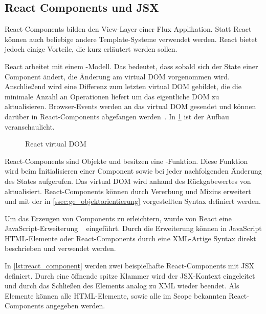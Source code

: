 \subsection{React Components und JSX}
\label{ssec:gf_react_components_und_jsx}

React-Components bilden den View-Layer einer Flux Applikation.  Statt React
können auch beliebige andere Template-Systeme verwendet werden.  React bietet
jedoch einige Vorteile, die kurz erläutert werden sollen.

React arbeitet mit einem -Modell.  Das bedeutet,
dass sobald sich der State einer Component ändert, die Änderung am virtual DOM
vorgenommen wird.  Anschließend wird eine Differenz zum letzten virtual DOM
gebildet, die die minimale Anzahl an Operationen liefert um das eigentliche DOM
zu aktualisieren.  Browser-Events werden an das virtual DOM gesendet und können
darüber in React-Components abgefangen werden~\cite{ReactDemystified}.
In \cref{fig:react_virtual_dom} ist der Aufbau veranschaulicht.

\begin{figure}
    \centering
    
    \caption{React virtual DOM}
    \label{fig:react_virtual_dom}
\end{figure}

React-Components sind Objekte und besitzen eine -Funktion.  Diese
Funktion wird beim Initialisieren einer Component sowie bei jeder nachfolgenden
Änderung des States aufgerufen.  Das virtual DOM wird anhand des Rückgabewertes
von  aktualisiert.  React-Components können durch Vererbung und
Mixins erweitert und mit der in \cref{ssec:ge_objektorientierung} vorgestellten
Syntax definiert werden.

Um das Erzeugen von Components zu erleichtern, wurde von React eine
JavaScript-Erweiterung ~\cite{JSX} eingeführt.  Durch die
Erweiterung können in JavaScript HTML-Elemente oder React-Components durch
eine XML-Artige Syntax direkt beschrieben und verwendet werden.

In \cref{lst:react_component} werden zwei beispielhafte React-Components mit JSX
definiert.  Durch eine öffnende spitze Klammer wird der JSX-Kontext eingeleitet
und durch das Schließen des Elements analog zu XML wieder beendet.  Als Elemente
können alle HTML-Elemente, sowie alle im Scope bekannten React-Components
angegeben werden.




